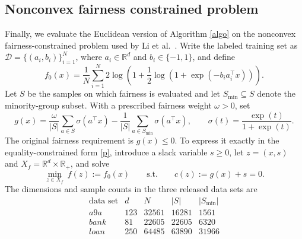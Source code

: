 \documentclass[11pt]{article}
\numberwithin{equation}{section}
\begin{document}
\subsection{Nonconvex fairness constrained problem}
Finally, we evaluate the Euclidean version of Algorithm \ref{algo} on the nonconvex fairness-constrained problem used by Li et al.~\cite{li2024stochastic}. Write the labeled training set as
\(\mathcal D=\{(a_i,b_i)\}_{i=1}^{N}\), where \(a_i\in\mathbb R^d\) and \(b_i\in\{-1,1\}\), and define
\[
   f_0(x)=\frac{1}{N}\sum_{i=1}^{N}
2\log(1+\frac{1}{2}\log(1+\exp(-b_i a_i^\top x))).
\]
Let \(S\) be the samples on which fairness is evaluated and let
\(S_{\min}\subseteq S\) denote the minority-group subset. With a prescribed fairness weight
\(\omega>0\), set
\[
    g(x)=
\frac{\omega}{|S|}\sum_{a\in S}\sigma(a^\top x)
-\frac{1}{|S|}\sum_{a\in S_{\min}}\sigma(a^\top x),
\qquad
\sigma(t)=\frac{\exp(t)}{1+\exp(t)}.
\]
The original fairness requirement is \(g(x)\le0\). To express it exactly in the equality-constrained form \eqref{p}, introduce a slack variable \(s\ge0\), let \(z=(x,s)\) and \(X_f=\mathbb R^d\times\mathbb R_+\), and solve
\[
\min_{z\in X_f}\ f(z):=f_0(x)
\qquad\text{s.t.}\qquad
 c(z):=g(x)+s=0.
\]
The dimensions and sample counts in the
three released data sets are
\[
\begin{array}{c|rrrr}
\text{data set} & d & N & |S| & | S_{\min}|\\ \hline
\textit{a9a}  & 123 & 32561 & 16281 & 1561\\
\textit{bank} & 81 & 22605 & 22605 & 6320\\
\textit{loan} & 250 & 64485 & 63890 & 31966
\end{array}
\]
\end{document}
